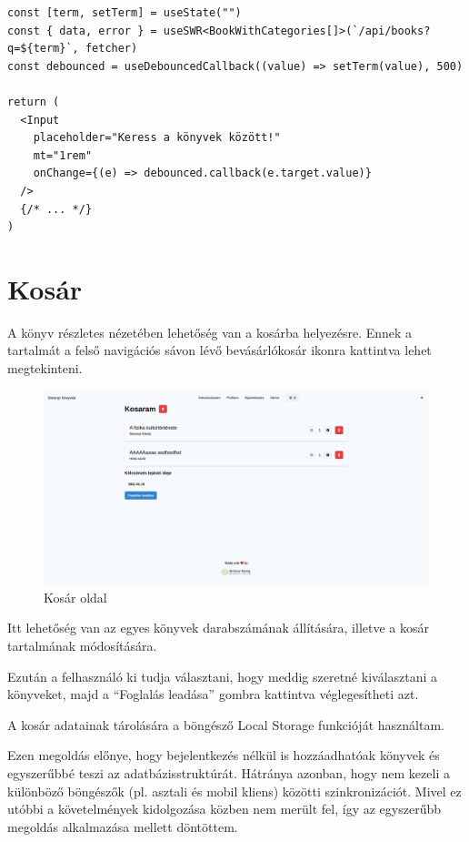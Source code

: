 \begin{lstlisting}[caption=A keresést megvalósító kódrészlet a frontenden]
const [term, setTerm] = useState("")
const { data, error } = useSWR<BookWithCategories[]>(`/api/books?q=${term}`, fetcher)
const debounced = useDebouncedCallback((value) => setTerm(value), 500)

return (
  <Input
    placeholder="Keress a könyvek között!"
    mt="1rem"
    onChange={(e) => debounced.callback(e.target.value)}
  />
  {/* ... */}
)
\end{lstlisting}

\section{Kosár}

A könyv részletes nézetében lehetőség van a kosárba helyezésre. Ennek a tartalmát a felső navigációs sávon lévő bevásárlókosár
ikonra kattintva lehet megtekinteni.

\begin{figure}[!ht]
  \centering
  \includegraphics[width=150mm, keepaspectratio]{figures/cart.png}
  \caption{Kosár oldal}
  \label{fig:CartPage}
\end{figure}

Itt lehetőség van az egyes könyvek darabszámának állítására, illetve a kosár tartalmának módosítására.

Ezután a felhasználó ki tudja választani, hogy meddig szeretné kiválasztani a könyveket, majd a ``Foglalás leadása'' gombra kattintva
véglegesítheti azt.

A kosár adatainak tárolására a böngésző Local Storage funkcióját használtam.

Ezen megoldás előnye, hogy bejelentkezés nélkül is hozzáadhatóak könyvek és egyszerűbbé teszi az adatbázisstruktúrát.
Hátránya azonban, hogy nem kezeli a különböző böngészők (pl. asztali és mobil kliens) közötti szinkronizációt. Mivel ez utóbbi a
követelmények kidolgozása közben nem merült fel, így az egyszerűbb megoldás alkalmazása mellett döntöttem.

